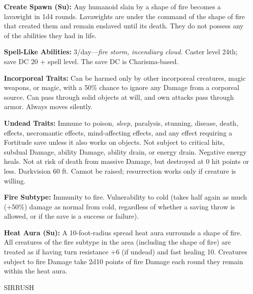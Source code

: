 \documentclass{article}
\begin{document}
{\textbf{Create Spawn (Su):} Any humanoid slain by a shape of fire becomes a lavawight 
in 1d4 rounds. Lavawights are under the command of the shape of fire that created 
them and remain enslaved until its death. They do not possess any of the abilities 
they had in life. 

\textbf{Spell-Like Abilities: }3/day---\textit{fire storm, incendiary cloud. }Caster 
level 24th; save DC 20 + spell level. The save DC is Charisma-based.

\textbf{Incorporeal Traits:} Can be harmed only by other incorporeal creatures, 
magic weapons, or magic, with a 50\% chance to ignore any Damage from a corporeal 
source. Can pass through solid objects at will, and own attacks pass through armor. 
Always moves silently. 

\textbf{Undead Traits:} Immune to poison, \textit{sleep, }paralysis, stunning, 
disease, death, effects, necromantic effects, mind-affecting effects, and any effect 
requiring a Fortitude save unless it also works on objects. Not subject to critical 
hits, subdual Damage, ability Damage, ability drain, or energy drain. Negative 
energy heals. Not at risk of death from massive Damage, but destroyed at 0 hit 
points or less. Darkvision 60 ft. Cannot be raised; resurrection works only if 
creature is willing. 

\textbf{Fire Subtype:} Immunity to fire. Vulnerability to cold (takes half again 
as much (+50\%) damage as normal from cold, regardless of whether a saving throw 
is allowed, or if the save is a success or failure).

\textbf{Heat Aura (Su):} A 10-foot-radius spread heat aura surrounds a shape of 
fire. All creatures of the fire subtype in the area (including the shape of fire) 
are treated as if having turn resistance +6 (if undead) and fast healing 10. Creatures 
subject to fire Damage take 2d10 points of fire Damage each round they remain within 
the heat aura. 

\vspace{12pt}
{\LARGE{}SIRRUSH }

}
\end{document}
